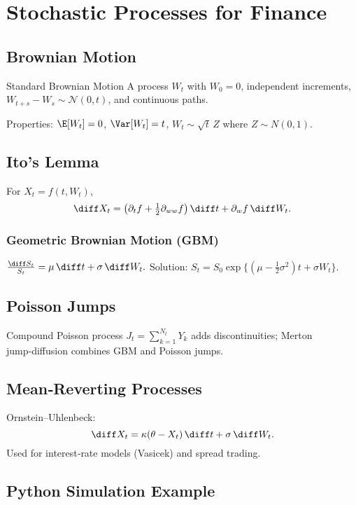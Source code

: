 \chapter{Stochastic Processes for Finance}\label{ch:stochproc}

\section{Brownian Motion}

\begin{definition}{Standard Brownian Motion}{}
A process \(W_t\) with \(W_0=0\), independent increments,
\(W_{t+s}-W_s \sim \mathcal N(0,t)\), and continuous paths.
\end{definition}

Properties:
\(\E[W_t]=0\), \(\Var[W_t]=t\), \(W_t \sim \sqrt{t}\,Z\) where \(Z\sim N(0,1)\).

\section{Ito’s Lemma}

For \(X_t=f(t,W_t)\),
\[
\diff X_t = \left(\partial_t f + \tfrac12 \partial_{ww}f\right)\diff t
           + \partial_w f\,\diff W_t.
\]

\subsection{Geometric Brownian Motion (GBM)}

\( \frac{\diff S_t}{S_t} = \mu\,\diff t + \sigma\,\diff W_t.\)
Solution:
\( S_t = S_0 \exp\bigl\{(\mu-\tfrac12\sigma^2)t + \sigma W_t\bigr\}.\)

\section{Poisson Jumps}

Compound Poisson process \(J_t=\sum_{k=1}^{N_t} Y_k\)
adds discontinuities; Merton jump‑diffusion
combines GBM and Poisson jumps.

\section{Mean‑Reverting Processes}

Ornstein–Uhlenbeck:
\[
\diff X_t = \kappa(\theta - X_t)\,\diff t + \sigma\,\diff W_t.
\]
Used for interest‑rate models (Vasicek) and spread trading.

\section*{Python Simulation Example}

